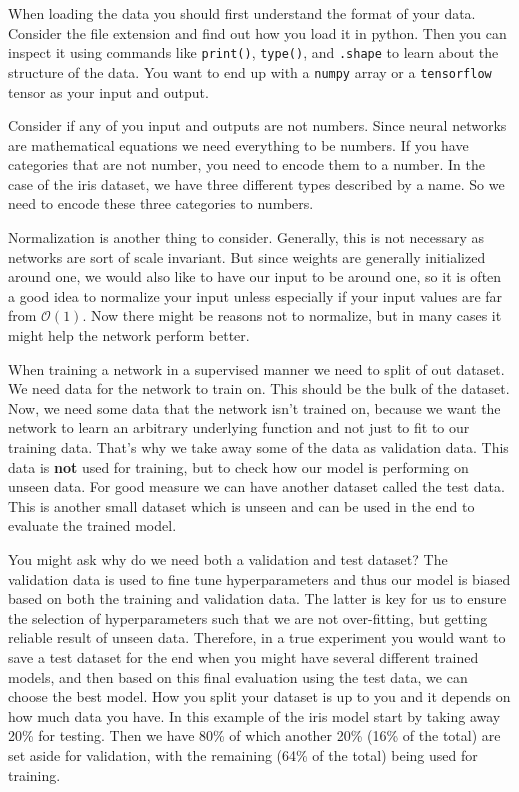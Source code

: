 \documentclass[11pt,a4paper]{article} %
\numberwithin{equation}{section}
\begin{document}
    	When loading the data you should first understand the format of your data. Consider the file extension and find out how you load it in python. Then you can inspect it using commands like \texttt{print()}, \texttt{type()}, and \texttt{.shape} to learn about the structure of the data. You want to end up with a \texttt{numpy} array or a \texttt{tensorflow} tensor as your input and output.
    	
    	Consider if any of you input and outputs are not numbers. Since neural networks are mathematical equations we need everything to be numbers. If you have categories that are not number, you need to encode them to a number. In the case of the iris dataset, we have three different types described by a name. So we need to encode these three categories to numbers.
    	
    	Normalization is another thing to consider. Generally, this is not necessary as networks are sort of scale invariant. But since weights are generally initialized around one, we would also like to have our input to be around one, so it is often a good idea to normalize your input unless especially if your input values are far from $\mathcal{O}(1)$. Now there might be reasons not to normalize, but in many cases it might help the network perform better. 
    	
    	When training a network in a supervised manner we need to split of out dataset. We need data for the network to train on. This should be the bulk of the dataset. Now, we need some data that the network isn't trained on, because we want the network to learn an arbitrary underlying function and not just to fit to our training data. That's why we take away some of the data as validation data. This data is \textbf{not} used for training, but to check how our model is performing on unseen data. For good measure we can have another dataset called the test data. This is another small dataset which is unseen and can be used in the end to evaluate the trained model.
    	
    	You might ask why do we need both a validation and test dataset? The validation data is used to fine tune hyperparameters and thus our model is biased based on both the training and validation data. The latter is key for us to ensure the selection of hyperparameters such that we are not over-fitting, but getting reliable result of unseen data. Therefore, in a true experiment you would want to save a test dataset for the end when you might have several different trained models, and then based on this final evaluation using the test data, we can choose the best model. How you split your dataset is up to you and it depends on how much data you have. In this example of the iris model start by taking away 20\% for testing. Then we have 80\% of which another 20\% (16\% of the total) are set aside for validation, with the remaining (64\% of the total) being used for training.
    	
\end{document}
